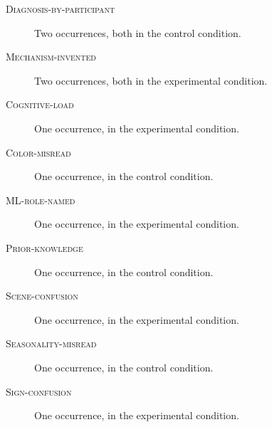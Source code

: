 \begin{description}
\item[\textnormal{\textsc{Diagnosis-by-participant}}] Two occurrences, both in the control condition.
\item[\textnormal{\textsc{Mechanism-invented}}] Two occurrences, both in the experimental condition.
\item[\textnormal{\textsc{Cognitive-load}}] One occurrence, in the experimental condition.
\item[\textnormal{\textsc{Color-misread}}] One occurrence, in the control condition.
\item[\textnormal{\textsc{ML-role-named}}] One occurrence, in the experimental condition.
\item[\textnormal{\textsc{Prior-knowledge}}] One occurrence, in the control condition.
\item[\textnormal{\textsc{Scene-confusion}}] One occurrence, in the experimental condition.
\item[\textnormal{\textsc{Seasonality-misread}}] One occurrence, in the control condition.
\item[\textnormal{\textsc{Sign-confusion}}] One occurrence, in the experimental condition.
\end{description}
